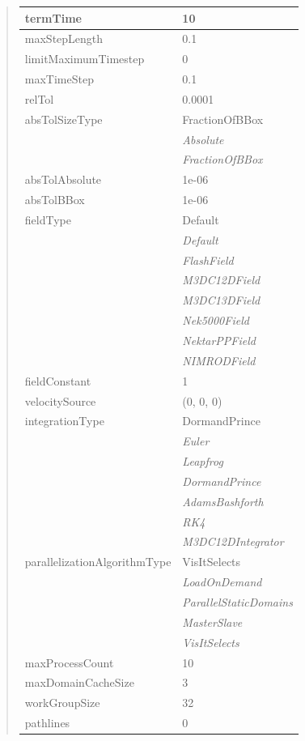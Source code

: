 \documentclass[letterpaper,10pt,english]{sphinxmanual}
\begin{document}
\begin{quote}
\begin{longtable}{|l|l|}
termTime
 & 
10
\\
\hline
maxStepLength
 & 
0.1
\\
\hline
limitMaximumTimestep
 & 
0
\\
\hline
maxTimeStep
 & 
0.1
\\
\hline
relTol
 & 
0.0001
\\
\hline
absTolSizeType
 & 
FractionOfBBox
\\
\hline & 
\emph{Absolute}
\\
\hline & 
\emph{FractionOfBBox}
\\
\hline
absTolAbsolute
 & 
1e-06
\\
\hline
absTolBBox
 & 
1e-06
\\
\hline
fieldType
 & 
Default
\\
\hline & 
\emph{Default}
\\
\hline & 
\emph{FlashField}
\\
\hline & 
\emph{M3DC12DField}
\\
\hline & 
\emph{M3DC13DField}
\\
\hline & 
\emph{Nek5000Field}
\\
\hline & 
\emph{NektarPPField}
\\
\hline & 
\emph{NIMRODField}
\\
\hline
fieldConstant
 & 
1
\\
\hline
velocitySource
 & 
(0, 0, 0)
\\
\hline
integrationType
 & 
DormandPrince
\\
\hline & 
\emph{Euler}
\\
\hline & 
\emph{Leapfrog}
\\
\hline & 
\emph{DormandPrince}
\\
\hline & 
\emph{AdamsBashforth}
\\
\hline & 
\emph{RK4}
\\
\hline & 
\emph{M3DC12DIntegrator}
\\
\hline
parallelizationAlgorithmType
 & 
VisItSelects
\\
\hline & 
\emph{LoadOnDemand}
\\
\hline & 
\emph{ParallelStaticDomains}
\\
\hline & 
\emph{MasterSlave}
\\
\hline & 
\emph{VisItSelects}
\\
\hline
maxProcessCount
 & 
10
\\
\hline
maxDomainCacheSize
 & 
3
\\
\hline
workGroupSize
 & 
32
\\
\hline
pathlines
 & 
0
\\

\end{longtable}
\end{quote}
\end{document}
